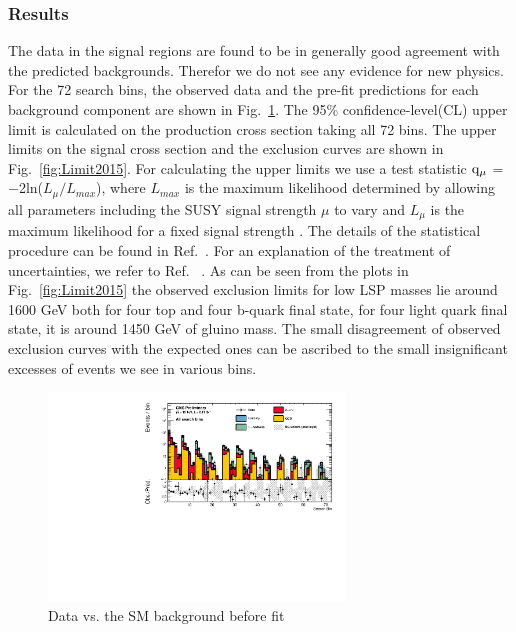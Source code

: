 

\subsubsection{Results}
The data in the signal regions are found to be in 
generally good agreement with the predicted backgrounds. Therefor we do not see any evidence for new physics. For the 72
search bins, the observed data and the pre-fit predictions for each background component are shown in Fig.~\ref{fig:Datavsbkg}. The 95\% confidence-level(CL) upper limit is calculated on the production cross section taking all 72 bins. The upper limits on the signal cross section and the exclusion curves are shown in Fig.~\ref{fig:Limit2015}. For calculating the upper limits we use  a test  statistic  $\rm q_{\mu}$ = $-$2ln($L_{\mu}/L_{max}$), where $L_{max}$ is the maximum likelihood determined by allowing all parameters including the SUSY signal strength $\mu$ to vary and $L_{\mu}$ is the maximum likelihood for a fixed signal strength . The details of the statistical procedure can be found in Ref.~\cite{CMS-NOTE-2011-005}.  For an explanation of the treatment of uncertainties, we refer to Ref. ~\cite{CMS-PAS-SUS-15-002}. As can be seen from the plots in Fig.~\ref{fig:Limit2015} the observed exclusion limits for low LSP masses lie around 1600 GeV both for four top and four b-quark final state, for four light quark final state, it is around 1450 GeV of gluino mass. The small disagreement of observed exclusion curves with the expected ones can be ascribed to the small insignificant excesses of events we see in various bins.  
\begin{figure}[h]
\begin{center}
\includegraphics[width=0.70\textwidth]{prefit-results-all-log.pdf}
\caption{\label{fig:Datavsbkg} Data vs. the SM background before fit}
\end{center}
\end{figure}
